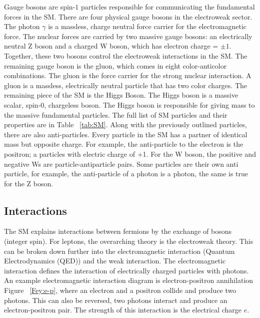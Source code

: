 \indent Gauge bosons are spin-${1}$ particles responsible for communicating the fundamental forces in the SM. There are four physical gauge bosons in the electroweak sector. The photon ${\gamma}$ is a massless, charge neutral force carrier for the electromagnetic force. The nuclear forces are carried by two massive gauge bosons:  an electrically neutral Z boson and a charged W boson, which has electron charge = ${\pm 1}$. Together, these two bosons control the electroweak interactions in the SM. The remaining gauge boson is the gluon, which comes in eight color-anticolor combinations. The gluon is the force carrier for the strong nuclear interaction. A gluon is a massless, electrically neutral particle that has two color charges. \newline%
\indent The remaining piece of the SM is the Higgs Boson. The Higgs boson is a massive scalar, spin-${0}$, chargeless boson. The Higgs boson is responsible for giving mass to the massive fundamental particles. The full list of SM particles and their properties are in Table ~\ref{tab:SM}.\newline
\indent Along with the previously outlined particles, there are also anti-particles. Every particle in the SM has a partner of identical mass but opposite charge. For example, the anti-particle to the electron is the positron; a particles with electric charge of +1. For the W boson, the positive and negative Ws are particle-antiparticle pairs. Some particles are their own anti particle, for example, the anti-particle of a photon is a photon, the same is true for the Z boson.\newline
\subsection{Interactions}
The SM explains interactions between fermions by the exchange of bosons (integer spin). For leptons, the overarching theory is the electroweak theory. This can be broken down further into the electromagnetic interaction (Quantum Electrodynamics (QED)) and the weak interaction. The electromagnetic interaction defines the interaction of electrically charged particles with photons. An example electromagnetic interaction diagram is electron-positron annihilation Figure ~\ref{Fey:e-p}, where an electron and a positron collide and produce two photons. This can also be reversed, two photons interact and produce an electron-positron pair. The strength of this interaction is the electrical charge $e$. \newline

